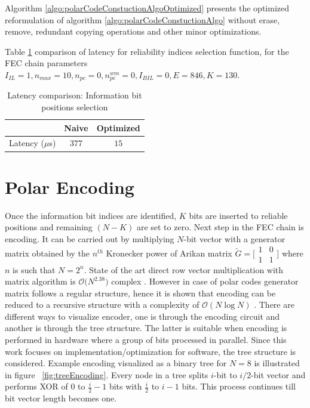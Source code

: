Algorithm \ref{algo:polarCodeConstuctionAlgoOptimized} presents the optimized reformulation of algorithm \ref{algo:polarCodeConstuctionAlgo} without erase, remove, redundant copying operations and other minor optimizations.

Table \ref{tab:codeConstrLatency} comparison of latency for reliability indices selection function, for the FEC chain parameters $I_{IL} = 1, n_{max} = 10, n_{pc} = 0 ,n_{pc}^{wm} = 0, I_{BIL} = 0, E = 846, K = 130$. 
\begin{table}[!h]
	\begin{center}
		\caption{Latency comparison: Information bit positions selection}
		\label{tab:codeConstrLatency}
		\begin{tabular}{c|c|c} %
			\textbf{ } & Naive & Optimized \\
			\hline
			Latency ($\mu$s) & $377$ & $15$\\
		\end{tabular}
	\end{center}
\end{table}

\section{Polar Encoding}
Once the information bit indices are identified, $K$ bits are inserted to reliable positions and remaining  $(N-K)$ are set to zero. Next step in the FEC chain is encoding. It can be carried out by multiplying $N$-bit vector with a generator matrix obtained by the $n^{th}$ Kronecker power of Arikan matrix $\utilde{G} = \big[\begin{smallmatrix} 1 & 0 \\ 1 & 1 \end{smallmatrix}$\big]  where $n$ is such that $N = 2^{n}$. State of the art direct row vector multiplication with matrix algorithm is $\mathcal{O}\big(N^{2.38}\big)$ complex \cite{MatrixMultComplexity}. However in case of polar codes generator matrix follows a regular structure, hence it is shown that encoding can be reduced to a recursive structure with a complexity of $\mathcal{O}(N\log{}N)$ \cite{Arikan}. There are different ways to visualize encoder, one is through the encoding circuit and another is through the tree structure. The latter is suitable when encoding is performed in hardware where a group of bits processed in parallel. Since this work focuses on implementation/optimization for software, the tree structure is considered. Example encoding visualized as a binary tree for $N = 8$ is illustrated in figure ~\ref{fig:treeEncoding}. Every node in a tree splits $i$-bit to $i/2$-bit vector and performs XOR of $0$ to $\frac{i}{2}-1$ bits with $\frac{i}{2}$ to $i-1$ bits. This process continues till bit vector length becomes one.


